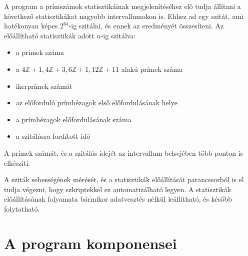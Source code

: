 A program a prímszámok statisztikáinak megjelenítéséhez elő tudja állítani a következő statisztikákat nagyobb intervallumokon is.
Ehhez ad egy szitát, ami hatékonyan képes $2^{64}$-ig szitálni, és ennek az eredményét összesíteni.
Az előállítható statisztikák adott $n$-ig szitálva:
\begin{itemize}
\item a prímek száma
\item a $4\mathbb{Z}+1, 4\mathbb{Z}+3, 6\mathbb{Z}+1, 12\mathbb{Z}+11$
	alakú prímek száma
\item ikerprímek számát
\item az előforduló prímhézagok első előfordulásának helye
\item a prímhézagok előfordulásának száma
\item a szitálásra fordított idő
\end{itemize}

A prímek számát, és a szitálás idejét az intervallum belsejében több ponton is elkészíti.

A sziták sebességének mérését, és a statisztikák előállítását parancssorból is el tudja végezni, hogy szkriptekkel ez automatizálható legyen.
A statisztikák előállításának folyamata bármikor adatvesztés nélkül leállítható, és később folytatható.

\pagebreak
\section{A program komponensei}

